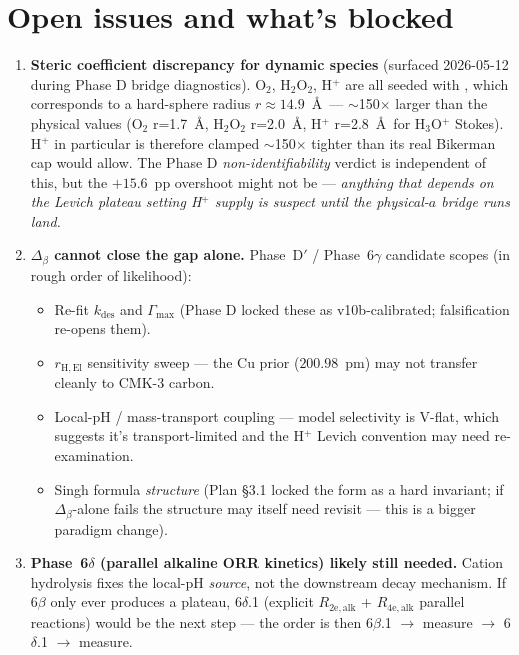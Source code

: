 \documentclass[11pt]{article}
\begin{document}
\section{Open issues and what's blocked}

\begin{enumerate}\setlength{\itemsep}{2pt}

\item \textbf{Steric coefficient discrepancy for dynamic species}
  (surfaced 2026-05-12 during Phase D bridge diagnostics).
  O$_2$, H$_2$O$_2$, H$^+$ are all seeded with
  , which corresponds to a hard-sphere radius
  $r \approx 14.9$~\AA\ ---  $\sim$150$\times$ larger than the physical
  values
  (O$_2$ r=1.7~\AA, H$_2$O$_2$ r=2.0~\AA, H$^+$ r=2.8~\AA\ for
  H$_3$O$^+$ Stokes).  H$^+$ in particular is therefore clamped
  $\sim$150$\times$ tighter than its real Bikerman cap would allow.
  The Phase D \emph{non-identifiability} verdict is independent of
  this, but the $+15.6$~pp overshoot might not be ---
  \emph{anything that depends on the Levich plateau setting H$^+$
  supply is suspect until the physical-$a$ bridge runs land.}

\item \textbf{$\Delta_\beta$ cannot close the gap alone.}
  Phase~D$'$ / Phase~6$\gamma$ candidate scopes (in rough order of
  likelihood):
  \begin{itemize}\setlength{\itemsep}{1pt}
    \item Re-fit $k_{\mathrm{des}}$ and $\Gamma_{\mathrm{max}}$ (Phase D
      locked these as v10b-calibrated; falsification re-opens them).
    \item $r_{\mathrm{H,El}}$ sensitivity sweep --- the Cu prior
      ($200.98$~pm) may not transfer cleanly to CMK-3 carbon.
    \item Local-pH / mass-transport coupling --- model selectivity is
      V-flat, which suggests it's transport-limited and the H$^+$
      Levich convention may need re-examination.
    \item Singh formula \emph{structure} (Plan §3.1 locked the form as
      a hard invariant; if $\Delta_\beta$-alone fails the structure
      may itself need revisit --- this is a bigger paradigm change).
  \end{itemize}

\item \textbf{Phase~6$\delta$ (parallel alkaline ORR kinetics) likely
  still needed.}  Cation hydrolysis fixes the local-pH \emph{source},
  not the downstream decay mechanism.  If 6$\beta$ only ever produces
  a plateau, 6$\delta$.1 (explicit $R_{\mathrm{2e,alk}}$ +
  $R_{\mathrm{4e,alk}}$ parallel reactions) would be the next step ---
  the order is then 6$\beta$.1 $\to$ measure $\to$ 6$\delta$.1
  $\to$ measure.


\end{enumerate}
\end{document}
